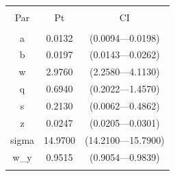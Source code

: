 
\begin{table}[!htbp] \centering 
  \caption{} 
  \label{} 
\begin{tabular}{@{\extracolsep{5pt}} ccc} 
\\[-1.8ex]\hline 
\hline \\[-1.8ex] 
Par & Pt & CI \\ 
\hline \\[-1.8ex] 
a & 0.0132 & (0.0094---0.0198) \\ 
b & 0.0197 & (0.0143---0.0262) \\ 
w & 2.9760 & (2.2580---4.1130) \\ 
q & 0.6940 & (0.2022---1.4570) \\ 
s & 0.2130 & (0.0062---0.4862) \\ 
z & 0.0247 & (0.0205---0.0301) \\ 
sigma & 14.9700 & (14.2100---15.7900) \\ 
w\_y & 0.9515 & (0.9054---0.9839) \\ 
\hline \\[-1.8ex] 
\end{tabular} 
\end{table} 
